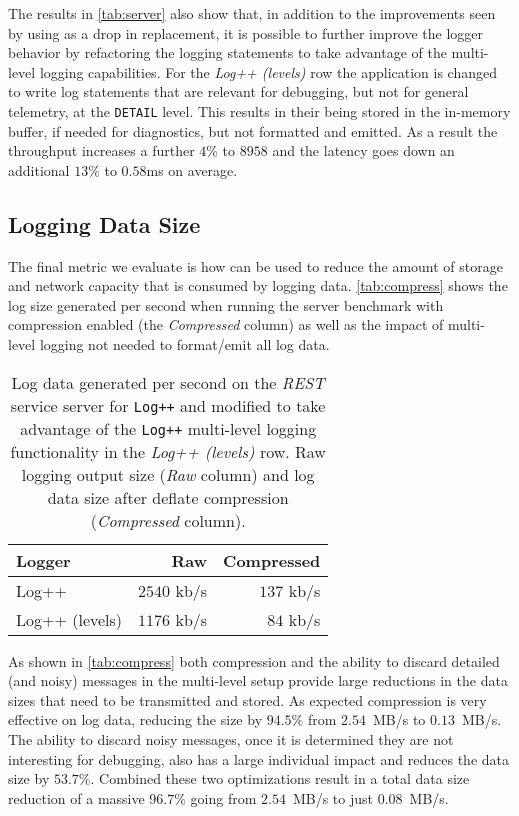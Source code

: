 The results in \autoref{tab:server} also show that, in addition to the improvements 
seen by using \projn as a drop in replacement, it is possible to further improve the 
logger behavior by refactoring the logging statements to take advantage of the 
multi-level logging capabilities. For the \emph{Log++ (levels)} row the application is 
changed to write log statements that are relevant for debugging, but not for general 
telemetry, at the \texttt{DETAIL} level. This results in their being stored in 
the in-memory buffer, if needed for diagnostics, but not formatted and emitted. As 
a result the throughput increases a further $4\%$ to $8958$ and the latency goes 
down an additional $13\%$ to $0.58$ms on average.

\subsection{Logging Data Size}
The final metric we evaluate is how \projn can be used to reduce the amount of 
storage and network capacity that is consumed by logging data. \autoref{tab:compress} 
shows the log size generated per second when running the server benchmark with compression 
enabled (the \emph{Compressed} column) as well as the impact of multi-level 
logging not needed to format/emit all log data.

\begin{table}[t]  
    \centering
    {\small
    \begin{tabular}{l | r r }
    Logger        & Raw & Compressed \\
    \hline
    Log++          & $2540$ kb/s & $137$ kb/s \\
    Log++ (levels) & $1176$ kb/s & $84$ kb/s   \\
    \end{tabular}
    }
    \vspace{2mm}
    \caption{\small Log data generated per second on the \emph{REST} service server for \texttt{Log++}
    and modified to take advantage of the \texttt{Log++} 
    multi-level logging functionality in the \emph{Log++ (levels)} row. Raw 
    logging output size (\emph{Raw} column) and log data size after deflate 
    compression (\emph{Compressed} column).}
    \label{tab:compress}
\end{table}

As shown in \autoref{tab:compress} both compression and the ability to 
discard detailed (and noisy) messages in the multi-level setup provide 
large reductions in the data sizes that need to be transmitted and stored. 
As expected compression is very effective on log data, reducing the size 
by $94.5\%$ from $2.54$~MB/s to $0.13$~MB/s. The ability to discard noisy messages, 
once it is determined they are not interesting for debugging, also has a 
large individual impact and reduces the data size by $53.7\%$. Combined these 
two optimizations result in a total data size reduction of a massive $96.7\%$ 
going from $2.54$~MB/s to just $0.08$~MB/s.
